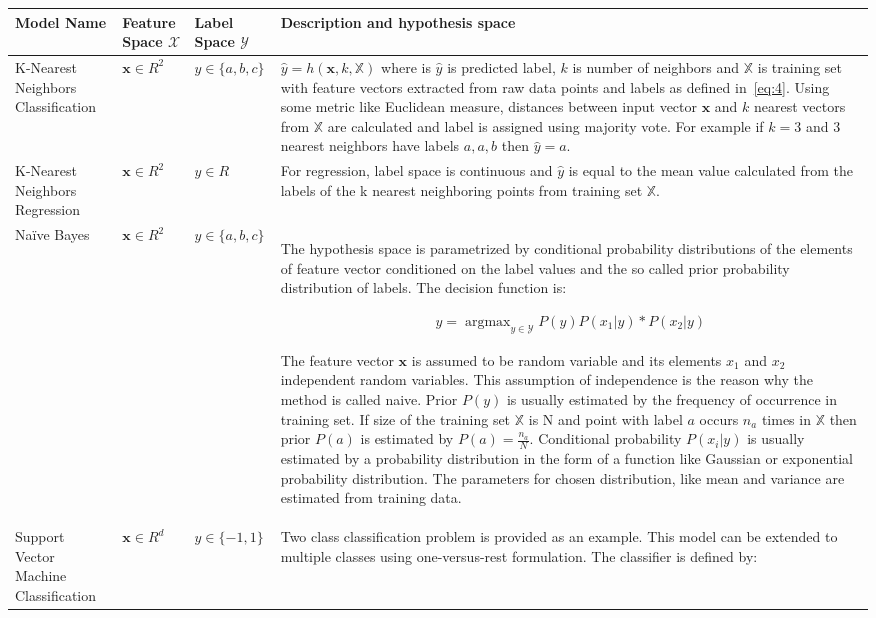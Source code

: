 \documentclass[english, 12pt, a4paper, elec, utf8, online]{aaltothesis}
\DeclareMathOperator*{\argmax}{argmax} %
\begin{document}
\begin{longtable}{ |p{3cm}|p{1.5cm}|p{2.2cm}|p{9cm}| } 
\hline
\textbf{Model Name} & \textbf{Feature Space} $\mathcal{X}$ & \textbf{Label Space} $\mathcal{Y}$  & \textbf{Description and hypothesis space} \\
\hline
K-Nearest Neighbors \newline Classification 
& $\mathbf{x} \in R^2$ 
& $y \in \{a, b, c\}$ 
& $\hat{y} = h(\mathbf{x}, k, \mathbb{X})$ where is $\hat{y}$ is predicted label, $k$ is number of neighbors and $\mathbb{X}$ is training set with feature vectors extracted from raw data points and labels as defined in~\ref{eq:4}. Using some metric like Euclidean measure, distances between input vector $\mathbf{x}$ and $k$ nearest vectors from $\mathbb{X}$ are calculated and label is assigned using majority vote. For example if $k=3$ and 3 nearest neighbors have labels $a,a,b$ then $\hat{y}=a$.      
\\ 
\hline 
K-Nearest Neighbors \newline Regression 
& $\mathbf{x} \in R^2$ 
& $y \in R$ 
& For regression, label space is continuous and $\hat{y}$ is equal to the mean value calculated from the labels of the k nearest neighboring points from training set $\mathbb{X}$. 
\\
\hline
Naïve Bayes 
& $\mathbf{x} \in R^2$  
& $y \in \{a, b, c\}$ 
& The hypothesis space is parametrized by conditional probability distributions of the elements of feature vector conditioned on the label values and the so called prior probability distribution of labels. The decision function is:

\begin{align*}
\hat{y} = \argmax_{y \in \mathcal{Y}} P(y)P(x_1|y)*P(x_2|y) 
\end{align*}  

The feature vector $\mathbf{x}$ is assumed to be random variable and its elements $x_{1}$ and $x_{2}$ independent random variables. This assumption of independence is the reason why the method is called naive. Prior $P(y)$ is usually estimated by the frequency of occurrence in training set. If size of the training set $\mathbb{X}$ is N and point with label $a$ occurs $n_a$ times in $\mathbb{X}$ then prior $P(a)$ is estimated by $P(a)=\frac{n_a}{N}$. Conditional probability $P(x_i|y)$ is usually estimated by  a probability distribution in the form of a function like Gaussian or exponential probability distribution. The parameters for chosen distribution, like mean and variance are estimated from training data.      
\\ 
\hline 
Support Vector Machine \newline Classification 
& $\mathbf{x} \in R^d$  
& $y \in \{-1, 1\}$
& Two class classification problem is provided as an example. This model can be extended to multiple classes using one-versus-rest formulation. The classifier is defined by:


\end{longtable}
\end{document}
